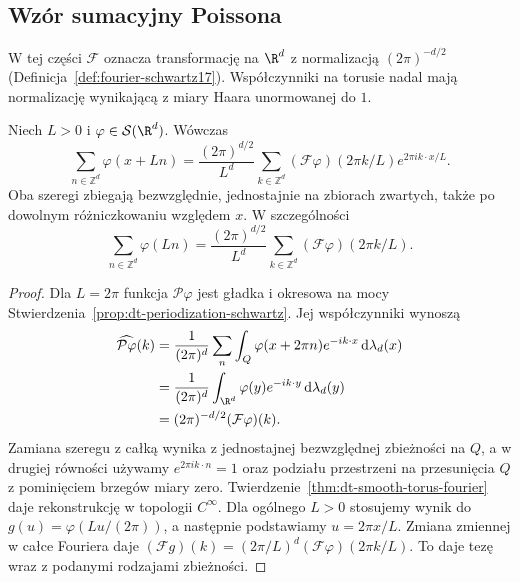 \subsection{Wzór sumacyjny Poissona}

W tej części $\mathcal F$ oznacza transformację
na $\R^d$ z normalizacją $(2\pi)^{-d/2}$
(Definicja~\ref{def:fourier-schwartz17}).
Współczynniki na torusie nadal mają normalizację
wynikającą z miary Haara unormowanej do $1$.

\begin{twierdzenie}
\label{thm:dt-poisson-summation}
Niech $L>0$ i $\varphi\in\mathcal S(\R^d)$.
Wówczas
\[
 \sum_{n\in\mathbb Z^d}\varphi(x+Ln)
 =\frac{(2\pi)^{d/2}}{L^d}
 \sum_{k\in\mathbb Z^d}
 (\mathcal F\varphi)(2\pi k/L)e^{2\pi i k\cdot x/L}.
\]
Oba szeregi zbiegają bezwzględnie, jednostajnie
na zbiorach zwartych, także po dowolnym
różniczkowaniu względem $x$.
W szczególności
\[
 \sum_{n\in\mathbb Z^d}\varphi(Ln)
 =\frac{(2\pi)^{d/2}}{L^d}
 \sum_{k\in\mathbb Z^d}(\mathcal F\varphi)(2\pi k/L).
\]
\end{twierdzenie}
\begin{proof}
Dla $L=2\pi$ funkcja $\mathcal P\varphi$ jest gładka
i okresowa na mocy
Stwierdzenia~\ref{prop:dt-periodization-schwartz}.
Jej współczynniki wynoszą
\[
 \begin{aligned}
 \widehat{\mathcal P\varphi}(k)
 &=\frac1{(2\pi)^d}\sum_n\int_Q
 \varphi(x+2\pi n)e^{-ik\cdot x}\,\mathrm d\lambda_d(x)\\
 &=\frac1{(2\pi)^d}\int_{\R^d}
 \varphi(y)e^{-ik\cdot y}\,\mathrm d\lambda_d(y)\\
 &=(2\pi)^{-d/2}(\mathcal F\varphi)(k).
 \end{aligned}
\]
Zamiana szeregu z całką wynika z jednostajnej
bezwzględnej zbieżności na $Q$,
a w drugiej równości używamy
$e^{2\pi i k\cdot n}=1$ oraz podziału przestrzeni
na przesunięcia $Q$ z pominięciem brzegów miary zero.
Twierdzenie~\ref{thm:dt-smooth-torus-fourier}
daje rekonstrukcję w topologii $C^\infty$.
Dla ogólnego $L>0$ stosujemy wynik do
$g(u)=\varphi(Lu/(2\pi))$, a następnie
podstawiamy $u=2\pi x/L$.
Zmiana zmiennej w całce Fouriera daje
$(\mathcal Fg)(k)=(2\pi/L)^d
(\mathcal F\varphi)(2\pi k/L)$.
To daje tezę wraz z podanymi rodzajami zbieżności.
\end{proof}

